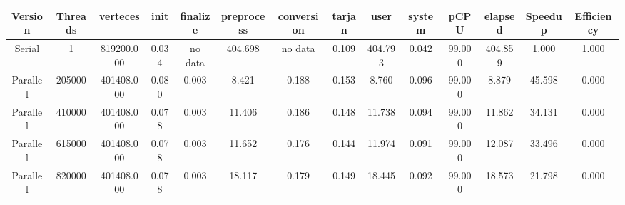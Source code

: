 \begin{tabular}{|c|c|c|c|c|c|c|c|c|c|c|c|c|c|}
\toprule
 Version &  Threads &   verteces &  init & finalize &  preprocess & conversion &  tarjan &    user &  system &   pCPU &  elapsed &  Speedup &  Efficiency \\
\midrule
  Serial &        1 & 819200.000 & 0.034 &  no data &     404.698 &    no data &   0.109 & 404.793 &   0.042 & 99.000 &  404.859 &    1.000 &       1.000 \\
Parallel &   205000 & 401408.000 & 0.080 &    0.003 &       8.421 &      0.188 &   0.153 &   8.760 &   0.096 & 99.000 &    8.879 &   45.598 &       0.000 \\
Parallel &   410000 & 401408.000 & 0.078 &    0.003 &      11.406 &      0.186 &   0.148 &  11.738 &   0.094 & 99.000 &   11.862 &   34.131 &       0.000 \\
Parallel &   615000 & 401408.000 & 0.078 &    0.003 &      11.652 &      0.176 &   0.144 &  11.974 &   0.091 & 99.000 &   12.087 &   33.496 &       0.000 \\
Parallel &   820000 & 401408.000 & 0.078 &    0.003 &      18.117 &      0.179 &   0.149 &  18.445 &   0.092 & 99.000 &   18.573 &   21.798 &       0.000 \\
\bottomrule
\end{tabular}
